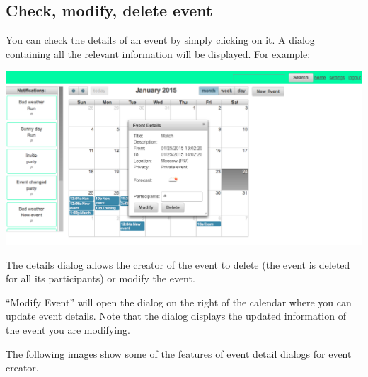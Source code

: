 \documentclass[10pt,a4paper,titlepage]{article}
\begin{document}
\subsection{Check, modify, delete event}
You can check the details of an event by simply clicking on it. A dialog containing all the relevant information will be displayed. For example:

\begin{center}
\includegraphics[width=\linewidth]{./images/14_home_details.png}
\end{center}

The details dialog allows the creator of the event to delete (the event is deleted for all its participants) or modify the event.

“Modify Event” will open the dialog on the right of the calendar where you can update event details. Note that the dialog displays the updated information of the event you are modifying.

The following images show some of the features of event detail dialogs for event creator.
\end{document}
